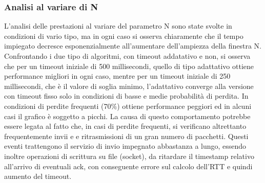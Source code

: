 \subsubsection{Analisi al variare di N}
L'analisi delle prestazioni al variare del parametro N sono state svolte in 
condizioni di vario tipo, ma in ogni caso si osserva chiaramente che il tempo
impiegato decresce esponenzialmente all'aumentare dell'ampiezza della finestra
N.\\
Confrontando i due tipo di algoritmi, con timeout addatativo e non, si osserva
che per un timeout iniziale di 500 millisecondi, quello di tipo adattativo 
ottiene performance migliori in ogni caso, mentre per un timeout iniziale di 
250 millisecondi, che è il valore di soglia minimo, l'adattativo converge 
alla versione con timeout fisso solo in condizioni di basse e medie probabilità di 
perdita. In condizioni di perdite frequenti (70\%) ottiene performance peggiori ed 
in alcuni casi il grafico è soggetto a picchi. La causa di questo comportamento 
potrebbe essere legata al fatto che, in casi di perdite frequenti, si verificano
altrettanto frequentemente invii e e ritrasmissioni di un gran numero di pacchetti.
Questi eventi trattengono il servizio di invio impegnato abbastanza a lungo,
essendo inoltre operazioni di scrittura su file (socket), da
ritardare il timestamp relativo all'arrivo di eventuali ack, con conseguente 
errore sul calcolo dell'RTT e quindi aumento del timeout.
